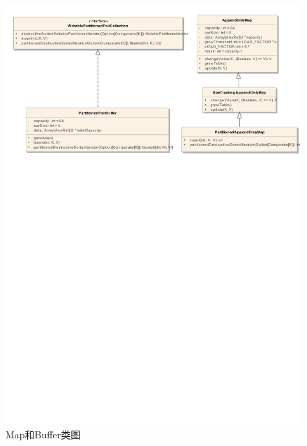 \begin{figure}[H] 
	\centering
	\includegraphics[width=\textwidth]{figures/collection.pdf}
	\caption{Map和Buffer类图}
	\label{fig:mapAndBuffer}
\end{figure}

